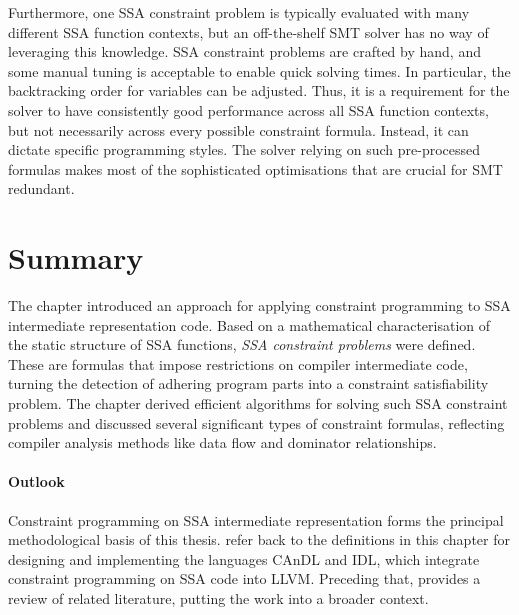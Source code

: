     Furthermore, one SSA constraint problem is typically evaluated with many
    different SSA function contexts, but
    an off-the-shelf SMT solver has no way of leveraging this knowledge.
    SSA constraint problems are crafted by hand, and some manual tuning is
    acceptable to enable quick solving times.
    In particular, the backtracking order for variables can be adjusted.
    Thus, it is a requirement for the solver to have consistently good
    performance across all SSA function contexts, but not necessarily across
    every possible constraint formula.
    Instead, it can dictate specific programming styles.
    The solver relying on such pre-processed formulas makes most of the
    sophisticated optimisations that are crucial for SMT redundant.

\section{Summary}

    The chapter introduced an approach for applying constraint programming to
    SSA intermediate representation code.
    Based on a mathematical characterisation of the static structure of SSA
    functions, {\it SSA constraint problems} were defined.
    These are formulas that impose restrictions on compiler intermediate code,
    turning the detection of adhering program parts into a constraint
    satisfiability problem.
    The chapter derived efficient algorithms for solving such SSA constraint
    problems and discussed several significant types of constraint formulas,
    reflecting compiler analysis methods like data flow and dominator
    relationships.

    \paragraph*{Outlook}
    Constraint programming on SSA intermediate representation forms the
    principal methodological basis of this thesis.
     refer back to the definitions in
    this chapter for designing and implementing the languages CAnDL and IDL,
    which integrate constraint programming on SSA code into LLVM.
    Preceding that,  provides a review of related
    literature, putting the work into a broader context. 


    